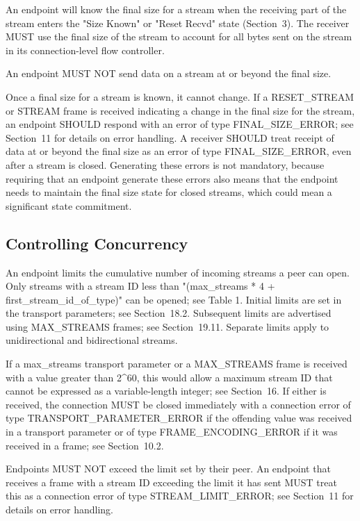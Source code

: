 \documentclass{article}
\begin{document}
An endpoint will know the final size for a stream when the receiving part of the stream enters the "Size Known" or "Reset Recvd" state (Section~3).  The receiver MUST use the final size of the stream to account for all bytes sent on the stream in its connection-level flow controller.

An endpoint MUST NOT send data on a stream at or beyond the final size.

Once a final size for a stream is known, it cannot change.  If a RESET\_STREAM or STREAM frame is received indicating a change in the final size for the stream, an endpoint SHOULD respond with an error of type FINAL\_SIZE\_ERROR; see Section~11 for details on error handling.  A receiver SHOULD treat receipt of data at or beyond the final size as an error of type FINAL\_SIZE\_ERROR, even after a stream is closed.  Generating these errors is not mandatory, because requiring that an endpoint generate these errors also means that the endpoint needs to maintain the final size state for closed streams, which could mean a significant state commitment.

\subsection{Controlling Concurrency}

An endpoint limits the cumulative number of incoming streams a peer can open.  Only streams with a stream ID less than "(max\_streams * 4 + first\_stream\_id\_of\_type)" can be opened; see Table 1.  Initial limits are set in the transport parameters; see Section~18.2. Subsequent limits are advertised using MAX\_STREAMS frames; see Section~19.11.  Separate limits apply to unidirectional and bidirectional streams.

If a max\_streams transport parameter or a MAX\_STREAMS frame is received with a value greater than 2\textasciicircum{}60, this would allow a maximum stream ID that cannot be expressed as a variable-length integer; see Section~16.  If either is received, the connection MUST be closed immediately with a connection error of type TRANSPORT\_PARAMETER\_ERROR if the offending value was received in a transport parameter or of type FRAME\_ENCODING\_ERROR if it was received in a frame; see Section~10.2.

Endpoints MUST NOT exceed the limit set by their peer.  An endpoint that receives a frame with a stream ID exceeding the limit it has sent MUST treat this as a connection error of type STREAM\_LIMIT\_ERROR; see Section~11 for details on error handling.
\end{document}
